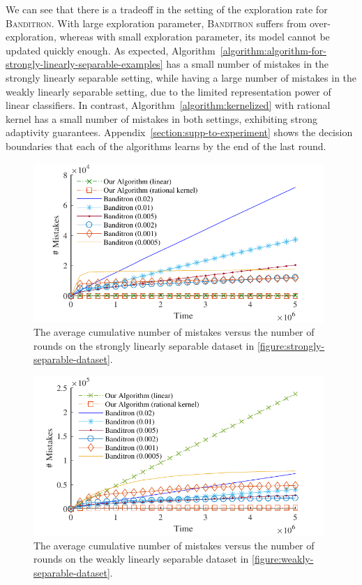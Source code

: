 We can see that there is a tradeoff in the setting of the exploration rate for
\textsc{Banditron}. With large exploration parameter, \textsc{Banditron} suffers
from over-exploration, whereas with small exploration parameter, its model
cannot be updated quickly enough. As expected,
Algorithm~\ref{algorithm:algorithm-for-strongly-linearly-separable-examples} has
a small number of mistakes in the strongly linearly separable setting, while
having a large number of mistakes in the weakly linearly separable setting, due
to the limited representation power of linear classifiers. In contrast,
Algorithm~\ref{algorithm:kernelized} with rational kernel has a small number of
mistakes in both settings, exhibiting strong adaptivity guarantees.
Appendix~\ref{section:supp-to-experiment} shows the decision boundaries that
each of the algorithms learns by the end of the last round.

\begin{minipage}{.45\textwidth}
\begin{figure}[H]
\centering
\includegraphics[width=0.98\textwidth]{figures/strong3}
\caption{The average cumulative number of mistakes versus the
number of rounds on the strongly linearly separable dataset in
\autoref{figure:strongly-separable-dataset}.}
\label{figure:number-of-mistakes-strongly-separable-dataset}
\end{figure}
\end{minipage}
\hfill
\begin{minipage}{.45\textwidth}
\begin{figure}[H]
\centering
\includegraphics[width=0.98\textwidth]{figures/weak3}
\caption{The average cumulative number of mistakes versus the
number of rounds on the weakly linearly separable dataset in
\autoref{figure:weakly-separable-dataset}.}
\label{figure:number-of-mistakes-weakly-separable-dataset}
\end{figure}
\end{minipage}
